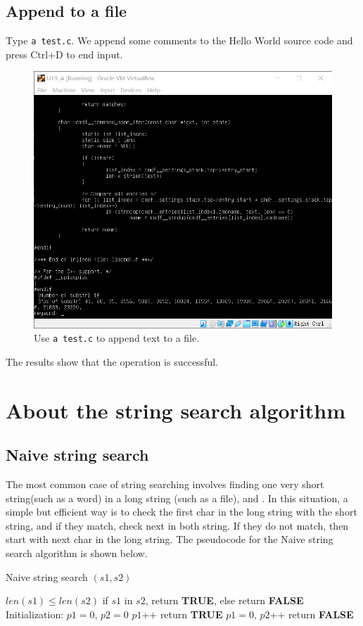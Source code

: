 \documentclass[cn,black,12pt,normal]{elegantnote}
\begin{document}
\subsection{Append to a file}
Type \lstinline{a test.c}. We append some comments to the Hello World source code and press Ctrl+D to end input.
\begin{figure}[H]
    \centering
    \includegraphics[width=0.6\linewidth]{image/kmp_05.jpg}
    \caption{Use \lstinline{a test.c} to append text to a file.}
\end{figure}
The results show that the operation is successful.



\section{About the string search algorithm}

\subsection{Naive string search}

The most common case of string searching involves finding one very short string(such as a word) in a long string (such as a file), and . In this situation, a simple but efficient way is to check the first char in the long string with the short string, and if they match, check next in both string. If they do not match, then start with next char in the long string. The pseudocode for the Naive string search algorithm is shown below.
\begin{algorithm}[H]
    \caption{Naive string search $(s1,s2)$}
    \label{alg1}
    \begin{algorithmic}
        \REQUIRE $len(s1) \leq len(s2) $
        \ENSURE if $s1$ in $s2$, return \textbf{TRUE}, else return \textbf{FALSE}
        \STATE Initialization: $p1 = 0$, $p2 = 0$
        \STATE $p1$++
        \STATE return \textbf{TRUE}
        \ENDIF
        \ENDWHILE
        \STATE $p1 = 0$, $p2$++
        \ENDWHILE
        \STATE return \textbf{FALSE}
    \end{algorithmic}
\end{algorithm}
\end{document}
